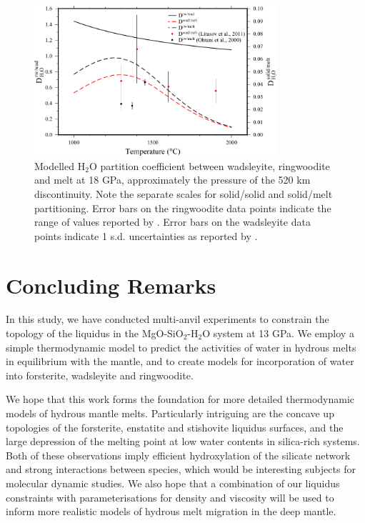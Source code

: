 \documentclass[review]{elsarticle}
\begin{document}
\begin{figure}[ht!]
  \centering
  \includegraphics[width=0.8\textwidth]{figures/rw_wad_partitioning_520}
  \caption{Modelled H$_2$O partition coefficient between wadsleyite, ringwoodite and melt at 18 GPa, approximately the pressure of the 520 km discontinuity. Note the separate scales for solid/solid and solid/melt partitioning. Error bars on the ringwoodite data points indicate the range of values reported by \cite{OMY2000}. Error bars on the wadsleyite data points indicate 1 s.d. uncertainties as reported by \cite{LSOK2011}.}
  \label{fig:partitioning_rw_wad}
\end{figure}

\section{Concluding Remarks}
In this study, we have conducted multi-anvil experiments to constrain the topology of the liquidus in the MgO-SiO$_2$-H$_2$O system at 13 GPa. We employ a simple thermodynamic model to predict the activities of water in hydrous melts in equilibrium with the mantle, and to create models for incorporation of water into forsterite, wadsleyite and ringwoodite. 

We hope that this work forms the foundation for more detailed thermodynamic models of hydrous mantle melts. Particularly intriguing are the concave up topologies of the forsterite, enstatite and stishovite liquidus surfaces, and the large depression of the melting point at low water contents in silica-rich systems. Both of these observations imply efficient hydroxylation of the silicate network and strong interactions between species, which would be interesting subjects for molecular dynamic studies. We also hope that a combination of our liquidus constraints with parameterisations for density and viscosity will be used to inform more realistic models of hydrous melt migration in the deep mantle.
\end{document}
